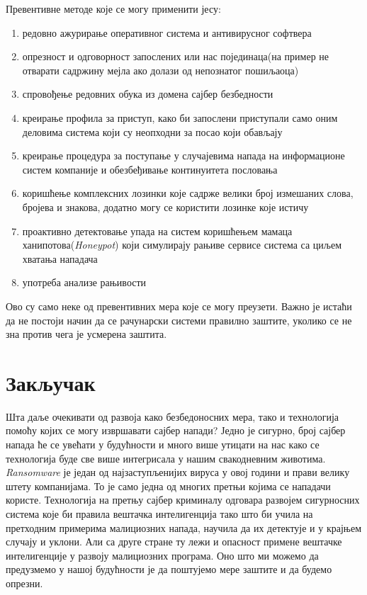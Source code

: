 \documentclass[a4paper]{article}
\begin{document}
	Превентивне методе које се могу применити јесу:
	\begin{enumerate}
		\item редовно ажурирање оперативног система и антивирусног софтвера
		\item опрезност и одговорност запослених или нас појединаца(на пример не отварати садржину мејла ако долази од непознатог пошиљаоца)
		\item спровођење редовних обука из домена сајбер безбедности 
		\item креирање профила за приступ, како би запослени приступали само оним деловима система који су неопходни за посао који обављају 
		\item креирање процедура за поступање у случајевима напада на инфор\-мационе систем компаније и обезбеђивање континуитета пословања 
		\item коришћење комплексних лозинки које садрже велики број измеша\-них слова, бројева и знакова, додатно могу се користити лозинке које истичу 			
		\item проактивно детектовање упада на систем коришћењем мамаца ханипотова({\em Honeypot}) који симулирају рањиве сервисе система са циљем хватања нападача 
		\item употреба анализе рањивости 
	\end{enumerate}
	
	Ово су само неке од превентивних мера које се могу преузети. Важно је истаћи да не постоји начин да се рачунарски системи правилно заштите, уколико се не зна против чега је усмерена заштита.
	\section{Закључак}
	\label{sec:Zakljucak}
	Шта даље очекивати од развоја како безбедоносних мера, тако и технологија помоћу којих се могу извршавати сајбер напади? Једно је сигурно, број сајбер напада ће се увећати у будућности и много више утицати на нас како се технологија буде све више интегрисала у нашим свакодневним животима. {\em Ransomware} је један од најзаступљени\-јих вируса у овој години и прави велику штету компанијама. То је само једна од многих претњи којима се нападачи користе. Технологија на претњу сајбер криминалу одговара развојем сигурносних система које би правила вештачка интелигенција тако што би учила на претходним примерима малициозних напада, научила да их детектује и у крајњем случају и уклони. Али са друге стране ту лежи и опасност примене вештачке интелигенције у развоју малициозних програма. Оно што ми можемо да предузмемо у нашој будућности је да поштујемо мере заштите и да будемо опрезни. 
\end{document}
